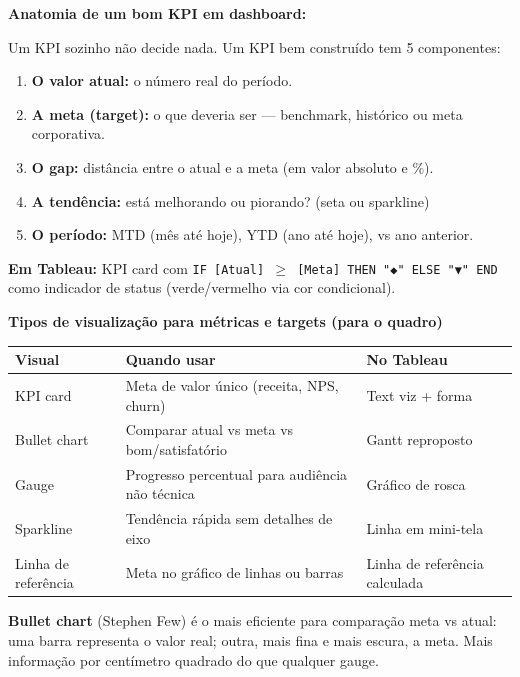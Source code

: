 \begin{SolvedBox}
\textbf{Anatomia de um bom KPI em dashboard:}

Um KPI sozinho não decide nada. Um KPI bem construído tem 5 componentes:
\begin{enumerate}
  \item \textbf{O valor atual:} o número real do período.
  \item \textbf{A meta (target):} o que deveria ser — benchmark, histórico ou meta corporativa.
  \item \textbf{O gap:} distância entre o atual e a meta (em valor absoluto e \%).
  \item \textbf{A tendência:} está melhorando ou piorando? (seta ou sparkline)
  \item \textbf{O período:} MTD (mês até hoje), YTD (ano até hoje), vs ano anterior.
\end{enumerate}

\textbf{Em Tableau:} KPI card com \texttt{IF [Atual] $\geq$ [Meta] THEN "\texttt{◆}" ELSE "\texttt{▼}" END}
como indicador de status (verde/vermelho via cor condicional).
\end{SolvedBox}

\begin{BoardBox}
\textbf{Tipos de visualização para métricas e targets (para o quadro)}

\begin{tabular}{|l|p{6.5cm}|p{4cm}|}
\hline
\textbf{Visual} & \textbf{Quando usar} & \textbf{No Tableau} \\
\hline
KPI card & Meta de valor único (receita, NPS, churn) & Text viz + forma \\
Bullet chart & Comparar atual vs meta vs bom/satisfatório & Gantt reproposto \\
Gauge & Progresso percentual para audiência não técnica & Gráfico de rosca \\
Sparkline & Tendência rápida sem detalhes de eixo & Linha em mini-tela \\
Linha de referência & Meta no gráfico de linhas ou barras & Linha de referência calculada \\
\hline
\end{tabular}

\textbf{Bullet chart} (Stephen Few) é o mais eficiente para comparação meta vs atual:
uma barra representa o valor real; outra, mais fina e mais escura, a meta.
Mais informação por centímetro quadrado do que qualquer gauge.
\end{BoardBox}

